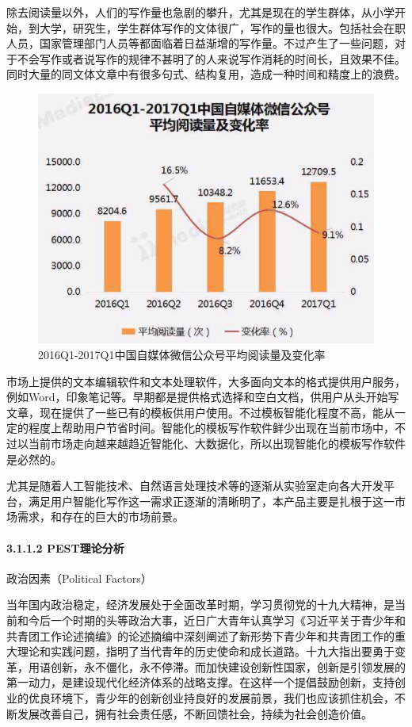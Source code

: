 \documentclass[10pt,letterpaper]{article}
\begin{document}
除去阅读量以外，人们的写作量也急剧的攀升，尤其是现在的学生群体，从小学开始，到大学，研究生，学生群体写作的文体很广，写作的量也很大。包括社会在职人员，国家管理部门人员等都面临着日益渐增的写作量。不过产生了一些问题，对于不会写作或者说写作的规律不甚明了的人来说写作消耗的时间长，且效果不佳。同时大量的同文体文章中有很多句式、结构复用，造成一种时间和精度上的浪费。

\begin{figure}[H]
	\begin{center}
		\includegraphics[width=0.5\linewidth]{___13.png}
		\caption{2016Q1-2017Q1中国自媒体微信公众号平均阅读量及变化率}
		\label{Fig:1}
	\end{center}
	\vspace{-0.5em}
\end{figure}

市场上提供的文本编辑软件和文本处理软件，大多面向文本的格式提供用户服务，例如Word，印象笔记等。早期都是提供格式选择和空白文档，供用户从头开始写文章，现在提供了一些已有的模板供用户使用。不过模板智能化程度不高，能从一定的程度上帮助用户节省时间。智能化的模板写作软件鲜少出现在当前市场中，不过以当前市场走向越来越趋近智能化、大数据化，所以出现智能化的模板写作软件是必然的。

尤其是随着人工智能技术、自然语言处理技术等的逐渐从实验室走向各大开发平台，满足用户智能化写作这一需求正逐渐的清晰明了，本产品主要是扎根于这一市场需求，和存在的巨大的市场前景。

\paragraph{3.1.1.2 PEST理论分析}
\rule{0pt}{0pt} 

政治因素（Political Factors）

当年国内政治稳定，经济发展处于全面改革时期，学习贯彻党的十九大精神，是当前和今后一个时期的头等政治大事，近日广大青年认真学习《习近平关于青少年和共青团工作论述摘编》的论述摘编中深刻阐述了新形势下青少年和共青团工作的重大理论和实践问题，指明了当代青年的历史使命和成长道路。十九大指出要勇于变革，用语创新，永不僵化，永不停滞。而加快建设创新性国家，创新是引领发展的第一动力，是建设现代化经济体系的战略支撑。在这样一个提倡鼓励创新，支持创业的优良环境下，青少年的创新创业持良好的发展前景，我们也应该抓住机会，不断发展改善自己，拥有社会责任感，不断回馈社会，持续为社会创造价值。
\end{document}
